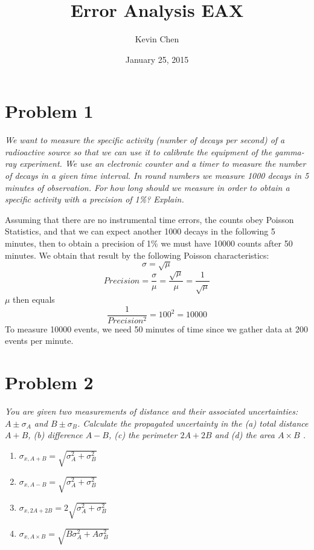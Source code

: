\documentclass[12pt]{article}
\begin{document}
\title{Error Analysis EAX}
\author{Kevin Chen}
\date{January 25, 2015}
\maketitle

\begin{obeylines}

\section{Problem 1}
{\footnotesize \textit{We want to measure the specific activity (number of decays per second) of a radioactive source so that we can use it to calibrate the equipment of the gamma-ray experiment. We use an electronic counter and a timer to measure the number of decays in a given time interval. In round numbers we measure 1000 decays in 5 minutes of observation. For how long should we measure in order to obtain a specific activity with a precision of 1\%? Explain.}}

Assuming that there are no instrumental time errors, the counts obey Poisson Statistics, and that we can expect another 1000 decays in the following 5 minutes, then to obtain a precision of 1\% we must have 10000 counts after 50 minutes. We obtain that result by the following Poisson characteristics: $$ \sigma = \sqrt{\mu} $$ $$ Precision = \frac{\sigma}{\mu} = \frac{\sqrt{\mu}}{\mu} = \frac{1}{\sqrt{\mu}} $$ $\mu$ then equals $$\frac{1}{Precision^2} = 100^2 = 10000 $$ To measure 10000 events, we need 50 minutes of time since we gather data at 200 events per minute.

\section{Problem 2}
{\footnotesize \textit{You are given two measurements of distance and their associated uncertainties: $A \pm \sigma_A$ and $B \pm \sigma_B$. Calculate the propagated uncertainty in the (a) total distance $A + B$, (b) difference $A - B$, (c) the perimeter $2A + 2B$ and (d) the area  $A \times B$ .}}

\begin{enumerate}
\item $ \sigma_{x, A+B} = \sqrt{\sigma_A^2 + \sigma_B^2} $
\item $ \sigma_{x, A-B} = \sqrt{\sigma_A^2 + \sigma_B^2} $ 
\item $ \sigma_{x, 2A+2B} = 2 \sqrt{\sigma_A^2 + \sigma_B^2} $
\item $ \sigma_{x, A \times B} = \sqrt{B\sigma_A^2 + A\sigma_B^2} $
\end{enumerate}
\end{obeylines}
\end{document}
